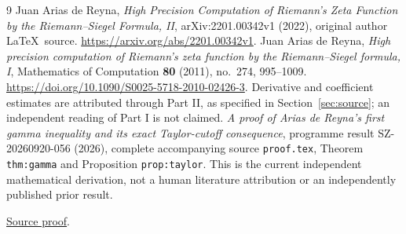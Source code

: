 \documentclass[11pt]{article}
\begin{document}
\begin{thebibliography}{9}
Juan Arias de Reyna,
\emph{High Precision Computation of Riemann's Zeta Function
by the Riemann--Siegel Formula, II}, arXiv:2201.00342v1
(2022), original author \LaTeX\ source.
\url{https://arxiv.org/abs/2201.00342v1}.
Juan Arias de Reyna,
\emph{High precision computation of Riemann's zeta function
by the Riemann--Siegel formula, I}, Mathematics of
Computation \textbf{80} (2011), no.~274, 995--1009.
\url{https://doi.org/10.1090/S0025-5718-2010-02426-3}.
Derivative and coefficient estimates are attributed
through Part II, as specified in Section~\ref{sec:source};
an independent reading of Part I is not claimed.
\emph{A proof of Arias de Reyna's first gamma inequality
and its exact Taylor-cutoff consequence}, programme
result SZ-20260920-056 (2026), complete accompanying
source \texttt{proof.tex}, Theorem \texttt{thm:gamma}
and Proposition \texttt{prop:taylor}. This is the current
independent mathematical derivation, not a human literature
attribution or an independently published prior result.

\href{https://github.com/KokunoYumeto/zeta-function-research-reader/blob/5992ad50c0f2a06921f1fcaded7b4e38097c0739/workbenches/splitzero-tandem/continuations/20260920-original-kernel-mixed-determinants/providers/GAMMA_INEQUALITY.tex\#L1}{Source proof}.
\end{thebibliography}
\end{document}
